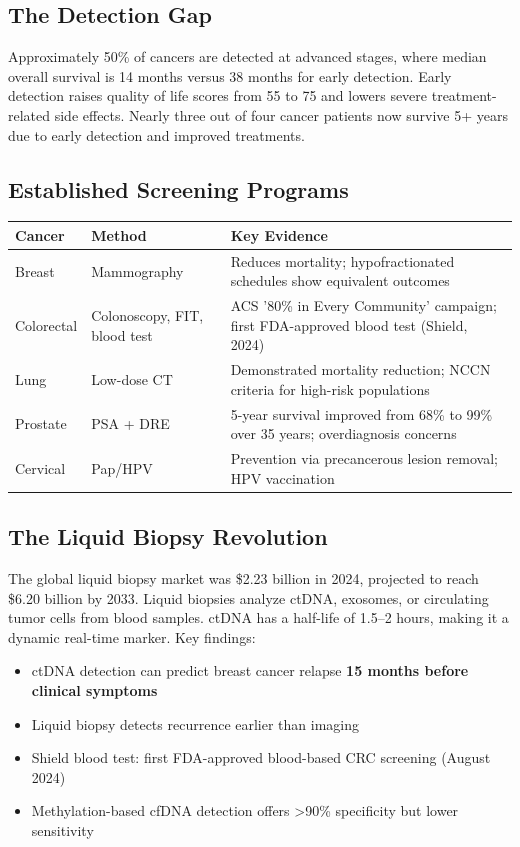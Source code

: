 \subsection{The Detection Gap}\label{the-detection-gap}

Approximately 50\% of cancers are detected at advanced stages, where
median overall survival is 14 months versus 38 months for early
detection. Early detection raises quality of life scores from 55 to 75
and lowers severe treatment-related side effects. Nearly three out of
four cancer patients now survive 5+ years due to early detection and
improved treatments.

\subsection{Established Screening
Programs}\label{established-screening-programs}

\begin{longtable}{p{3cm}p{4cm}p{6.5cm}}
\toprule
\textbf{Cancer} & \textbf{Method} & \textbf{Key Evidence} \\
\midrule
Breast & Mammography & Reduces mortality; hypofractionated schedules show equivalent outcomes \\
Colorectal & Colonoscopy, FIT, blood test & ACS '80\% in Every Community' campaign; first FDA-approved blood test (Shield, 2024) \\
Lung & Low-dose CT & Demonstrated mortality reduction; NCCN criteria for high-risk populations \\
Prostate & PSA + DRE & 5-year survival improved from 68\% to 99\% over 35 years; overdiagnosis concerns \\
Cervical & Pap/HPV & Prevention via precancerous lesion removal; HPV vaccination \\
\bottomrule
\end{longtable}

\subsection{The Liquid Biopsy
Revolution}\label{the-liquid-biopsy-revolution}

The global liquid biopsy market was \$2.23 billion in 2024, projected to
reach \$6.20 billion by 2033. Liquid biopsies analyze ctDNA, exosomes,
or circulating tumor cells from blood samples. ctDNA has a half-life of
1.5--2 hours, making it a dynamic real-time marker. Key findings:

\begin{itemize}
\tightlist
\item
  ctDNA detection can predict breast cancer relapse \textbf{15 months
  before clinical symptoms}
\item
  Liquid biopsy detects recurrence earlier than imaging
\item
  Shield blood test: first FDA-approved blood-based CRC screening
  (August 2024)
\item
  Methylation-based cfDNA detection offers \textgreater90\% specificity
  but lower sensitivity
\end{itemize}

